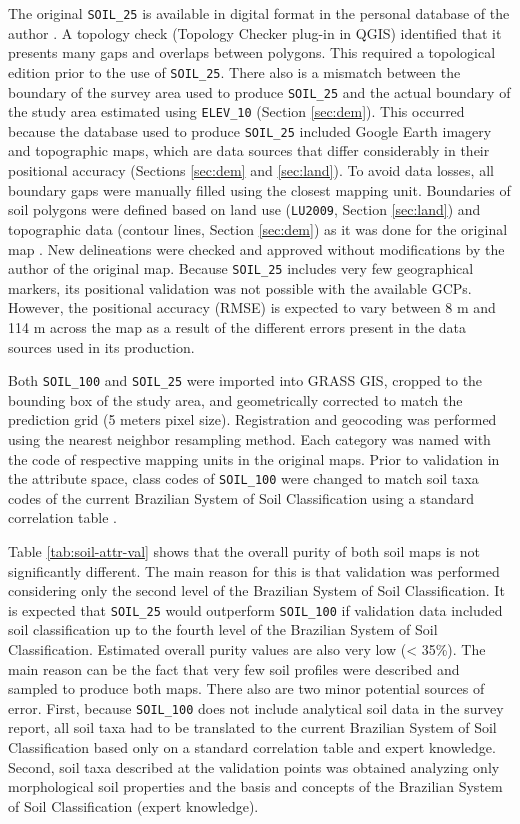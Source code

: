 The original \texttt{SOIL\_25} is available in digital format in the personal database of the author \citep{Miguel2010}. A topology check (Topology Checker plug-in in QGIS) identified that it presents many gaps and overlaps between polygons. This required a topological edition prior to the use of \texttt{SOIL\_25}. There also is a mismatch between the boundary of the survey area used to produce \texttt{SOIL\_25} and the actual boundary of the study area estimated using \texttt{ELEV\_10} (Section \ref{sec:dem}). This occurred because the database used to produce \texttt{SOIL\_25} included Google Earth imagery\textregistered{} and topographic maps, which are data sources that differ considerably in their positional accuracy (Sections \ref{sec:dem} and \ref{sec:land}). To avoid data losses, all boundary gaps were manually filled using the closest mapping unit. Boundaries of soil polygons were defined based on land use (\texttt{LU2009}, Section \ref{sec:land}) and topographic data (contour lines, Section \ref{sec:dem}) as it was done for the original map \citep{Miguel2010}. New delineations were checked and approved without modifications by the author of the original map. Because \texttt{SOIL\_25} includes very few geographical markers, its positional validation was not possible with the available GCPs. However, the positional accuracy (RMSE) is expected to vary between 8 m and 114 m across the map as a result of the different errors present in the data sources used in its production.

Both \texttt{SOIL\_100} and \texttt{SOIL\_25} were imported into GRASS GIS, cropped to the bounding box of the study area, and geometrically corrected to match the prediction grid (5 meters pixel size). Registration and geocoding was performed using the nearest neighbor resampling method. Each category was named with the code of respective mapping units in the original maps. Prior to validation in the attribute space, class codes of \texttt{SOIL\_100} were changed to match soil taxa codes of the current Brazilian System of Soil Classification using a standard correlation table \citep{SantosEtAl2006}.

Table \ref{tab:soil-attr-val} shows that the overall purity of both soil maps is not significantly different. The main reason for this is that validation was performed considering only the second level of the Brazilian System of Soil Classification. It is expected that \texttt{SOIL\_25} would outperform \texttt{SOIL\_100} if validation data included soil classification up to the fourth level of the Brazilian System of Soil Classification. Estimated overall purity values are also very low (< 35\%). The main reason can be the fact that very few soil profiles were described and sampled to produce both maps. There also are two minor potential sources of error. First, because \texttt{SOIL\_100} does not include analytical soil data in the survey report, all soil taxa had to be translated to the current Brazilian System of Soil Classification based only on a standard correlation table \citep{SantosEtAl2006} and expert knowledge. Second, soil taxa described at the validation points was obtained analyzing only morphological soil properties and the basis and concepts of the Brazilian System of Soil Classification (expert knowledge).

